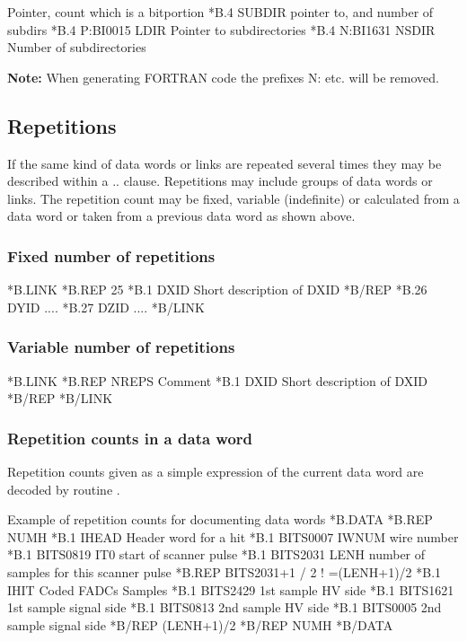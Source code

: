 \begin{XMPt}{Pointer, count which is a bitportion}
*B.4      SUBDIR     pointer to, and number of subdirs
*B.4      P:BI0015   LDIR     Pointer to subdirectories
*B.4      N:BI1631   NSDIR    Number of subdirectories
\end{XMPt}
 
{\bf Note:} When generating FORTRAN code the prefixes N: etc. will
            be removed.
 
\subsection{Repetitions}
If the same kind of data words or links are repeated several times
they may be described within a  ..  clause. 
Repetitions may include groups of data words or links. 
The repetition count may be fixed, variable
(indefinite) or calculated from a data word or taken from a previous
data word as shown above.
 
\subsubsection*{Fixed number of repetitions}
 
\begin{XMP}
*B.LINK
*B.REP    25
*B.1      DXID     Short description of DXID
*B/REP
*B.26     DYID     ....
*B.27     DZID     ....
*B/LINK
\end{XMP}
 
\subsubsection*{Variable number of repetitions}
 
\begin{XMP}
*B.LINK
*B.REP    NREPS    Comment
*B.1      DXID     Short description of DXID
*B/REP
*B/LINK
\end{XMP}
 
\subsubsection*{Repetition counts in a data word}
\begin{minipage}{\textwidth}
 
Repetition counts given as a simple expression of the current data
word are decoded by routine .
 
\begin{XMPt}{Example of repetition counts for documenting data words}
*B.DATA
*B.REP  NUMH
*B.1    IHEAD      Header word for a hit
*B.1    BITS0007   IWNUM   wire number
*B.1    BITS0819   IT0     start of scanner pulse
*B.1    BITS2031   LENH    number of samples for this scanner pulse
*B.REP  BITS2031+1 / 2     ! =(LENH+1)/2
*B.1    IHIT       Coded FADCs Samples
*B.1    BITS2429   1st sample HV side
*B.1    BITS1621   1st sample signal side
*B.1    BITS0813   2nd sample HV side
*B.1    BITS0005   2nd sample signal side
*B/REP  (LENH+1)/2
*B/REP  NUMH
*B/DATA
\end{XMPt}
\end{minipage}
 
